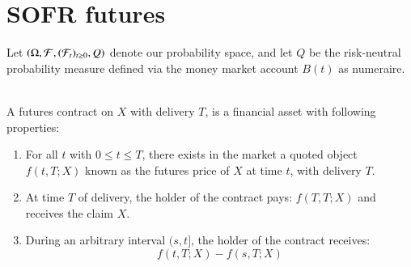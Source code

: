 \newpage 

\newpage 

\section{SOFR futures}
Let $(\Omega, \mathcal{F}, (\mathcal{F}_{t})_{t\geq 0}, Q)$ denote our probability space, and let $Q$ be the risk-neutral probability measure defined via  the money market account $B(t)$ as numeraire. 
\\~\\
\begin{definition}
A futures contract on $X$ with delivery $T$, is a financial asset with following properties: 
\begin{enumerate}[leftmargin =*]
    \item For all $t$ with $0\leq t \leq T$, there exists in the market a quoted object $f(t,T;X)$ known as the futures price of $X$ at time $t$, with delivery $T$. 
    \item At time $T$ of delivery, the holder of the contract pays: $f(T,T;X)$ and receives the claim $X$.
    \item During an arbitrary interval $(s,t]$, the holder of the contract receives: 
    \[
    f(t,T;X) - f(s,T;X)
    \]
\end{enumerate}
\end{definition}

